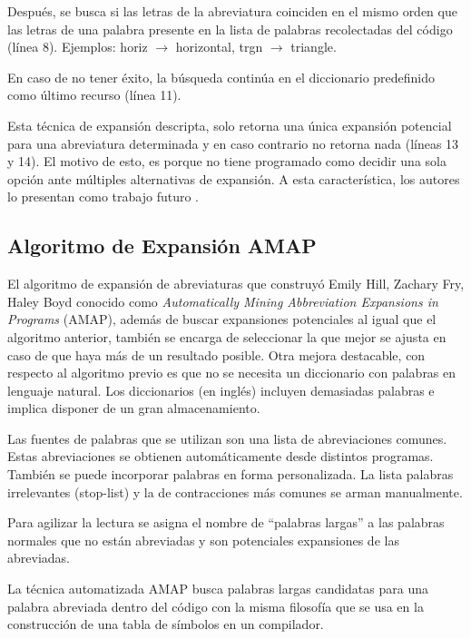 \documentclass[a4paper,12pt]{report}
\begin{document}
Después, se busca si las letras de la abreviatura coinciden en el mismo orden que las letras de una palabra presente en la lista de palabras recolectadas del código (línea 8). Ejemplos: \textsf{horiz} $\rightarrow$ \textsf{horizontal}, \textsf{trgn} $\rightarrow$ \textsf{triangle}.

En caso de no tener éxito, la búsqueda continúa en el diccionario predefinido como último recurso (línea 11).


Esta técnica de expansión descripta, solo retorna una única expansión potencial para una abreviatura determinada y en caso contrario no retorna nada (líneas 13 y 14). El motivo de esto, es porque no tiene programado como decidir una sola opción ante múltiples alternativas de expansión. A esta característica, los autores lo presentan como trabajo futuro \cite{LFBEX07,EZH08}.

\subsection{Algoritmo de Expansión AMAP}

El algoritmo de expansión de abreviaturas que construyó Emily Hill, Zachary Fry, Haley Boyd \cite{EZH08} conocido como \textit{Automatically Mining Abbreviation Expansions in Programs} (AMAP), además de buscar expansiones potenciales al igual que el algoritmo anterior, también se encarga de seleccionar la que mejor se ajusta en caso de que haya más de un resultado posible. Otra mejora destacable, con respecto al algoritmo previo es que no se necesita un diccionario con palabras en lenguaje natural. Los diccionarios (en inglés) incluyen demasiadas palabras e implica disponer de un gran almacenamiento. 

Las fuentes de palabras que se utilizan son una lista de abreviaciones comunes. Estas abreviaciones se obtienen automáticamente desde distintos programas. También se puede incorporar palabras en forma personalizada. La lista palabras irrelevantes (stop-list) y la de contracciones más comunes se arman manualmente.

Para agilizar la lectura se asigna el nombre de “palabras largas” a las palabras normales que no están abreviadas y son potenciales expansiones de las abreviadas.

La técnica automatizada AMAP busca palabras largas candidatas para una palabra abreviada dentro del código con la misma filosofía que se usa en la construcción de una tabla de símbolos en un compilador.
\end{document}
